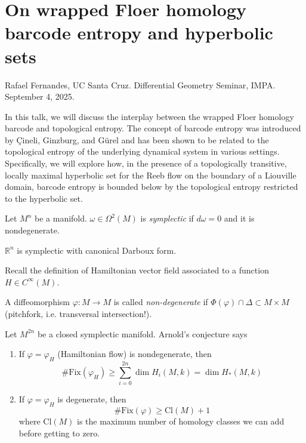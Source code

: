 {\section{On wrapped Floer homology barcode entropy and hyperbolic sets}
\label{section-wrapped-Floer-homology-barcode-entropy-and-hyperbolic-sets}

\noindent
Rafael Fernandes, UC Santa Cruz.
Differential Geometry Seminar, IMPA. 
September 4, 2025.

 In this talk, we will discuss the interplay between the
wrapped Floer homology barcode and topological entropy. The concept of barcode
entropy was introduced by Çineli, Ginzburg, and Gürel and has been shown to be
related to the topological entropy of the underlying dynamical system in various
settings. Specifically, we will explore how, in the presence of a topologically
transitive, locally maximal hyperbolic set for the Reeb flow on the boundary of
a Liouville domain, barcode entropy is bounded below by the topological entropy
restricted to the hyperbolic set.

\medskip\noindent

Let $M^n$ be a manifold.
$\omega \in \Omega^2(M)$ is {\it symplectic} if $d \omega=0$ and it is
nondegenerate.

\begin{example}
\label{example-Rn-is-symplectic}
$\mathbb{R}^n$ is symplectic with canonical Darboux form.
\end{example}

Recall the definition of Hamiltonian vector field
associated to a function $H \in C^\infty(M)$.

\begin{definition}
\label{definition-nondegenerate-diffeomorphism}
A diffeomorphism $\varphi:M \to M$ is called
{\it non-degenerate} if $\Phi(\varphi)\cap\Delta \subset M\times M$
(pitchfork, i.e. transversal intersection!).
\end{definition}

Let $M^{2n}$ be a closed symplectic manifold. Arnold's conjecture says
\begin{enumerate}
\item If $\varphi=\varphi_H$ (Hamiltonian flow) is nondegenerate, then
$$
\# \text{Fix}(\varphi_H) \geq \sum_{i=0}^{2n}\dim H_i(M,k)=\dim H_*(M,k)
$$
\item If $\varphi=\varphi_H$ is degenerate, then
$$
\# \text{Fix}(\varphi)\geq \text{Cl}(M)+1
$$
where $\text{Cl}(M)$ is the maximum number of homology classes
we can add before getting to zero.
\end{enumerate}

}
